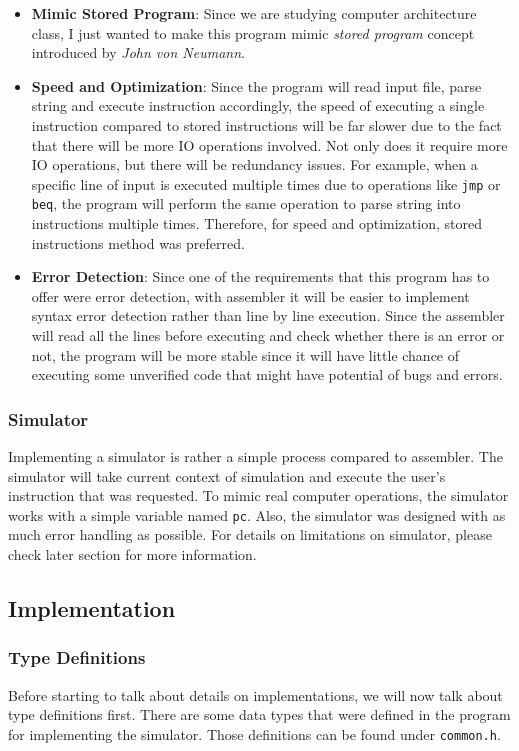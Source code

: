 \documentclass{homework}
\begin{document}
\begin{itemize}
    \item \textbf{Mimic Stored Program}: Since we are studying computer architecture class, I just wanted to make this program mimic \textit{stored program} concept introduced by \textit{John von Neumann}. 
    \item \textbf{Speed and Optimization}: Since the program will read input file, parse string and execute instruction accordingly, the speed of executing a single instruction compared to stored instructions will be far slower due to the fact that there will be more IO operations involved. Not only does it require more IO operations, but there will be redundancy issues. For example, when a specific line of input is executed multiple times due to operations like \texttt{jmp} or \texttt{beq}, the program will perform the same operation to parse string into instructions multiple times. Therefore, for speed and optimization, stored instructions method was preferred.
    \item \textbf{Error Detection}: Since one of the requirements that this program has to offer were error detection, with assembler it will be easier to implement syntax error detection rather than line by line execution. Since the assembler will read all the lines before executing and check whether there is an error or not, the program will be more stable since it will have little chance of executing some unverified code that might have potential of bugs and errors.
\end{itemize}

\subsubsection{Simulator}
Implementing a simulator is rather a simple process compared to assembler. The simulator will take current context of simulation and execute the user's instruction that was requested. To mimic real computer operations, the simulator works with a simple variable named \texttt{pc}. Also, the simulator was designed with as much error handling as possible. For details on limitations on simulator, please check later section for more information.

\subsection{Implementation}
\subsubsection{Type Definitions}
Before starting to talk about details on implementations, we will now talk about type definitions first. There are some data types that were defined in the program for implementing the simulator. Those definitions can be found under \texttt{common.h}.
\end{document}
